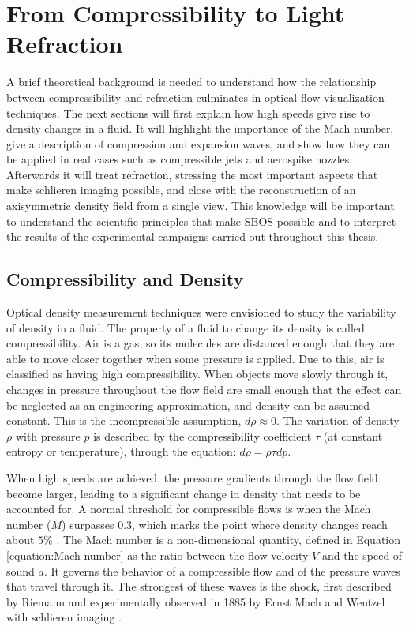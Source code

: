 \chapter{From Compressibility to Light Refraction}
\label{chapter: Theory}

\par A brief theoretical background is needed to understand how the relationship between compressibility and refraction culminates in optical flow visualization techniques. The next sections will first explain how high speeds give rise to density changes in a fluid. It will highlight the importance of the Mach number, give a description of compression and expansion waves, and show how they can be applied in real cases such as compressible jets and aerospike nozzles. Afterwards it will treat refraction, stressing the most important aspects that make schlieren imaging possible, and close with the reconstruction of an axisymmetric density field from a single view. This knowledge will be important to understand the scientific principles that make SBOS possible and to interpret the results of the experimental campaigns carried out throughout this thesis.


\section{Compressibility and Density}
\label{section: Compressibility}

\par Optical density measurement techniques were envisioned to study the variability of density in a fluid. The property of a fluid to change its density is called compressibility. Air is a gas, so its molecules are distanced enough that they are able to move closer together when some pressure is applied. Due to this, air is classified as having high compressibility. When objects move slowly through it, changes in pressure throughout the flow field are small enough that the effect can be neglected as an engineering approximation, and density can be assumed constant. This is the incompressible assumption, $d\rho \approx 0$. The variation of density $\rho$ with pressure $p$ is described by the compressibility coefficient $\tau$ (at constant entropy or temperature), through the equation: $d \rho =\rho \tau dp$.

\par When high speeds are achieved, the pressure gradients through the flow field become larger, leading to a significant change in density that needs to be accounted for. A normal threshold for compressible flows is when the Mach number ($M$) surpasses 0.3, which marks the point where density changes reach about $5\%$ \cite{TheBookOfAnderson}. The Mach number is a non-dimensional quantity, defined in Equation \ref{equation:Mach number} as the ratio between the flow velocity $V$ and the speed of sound $a$. It governs the behavior of a compressible flow and of the pressure waves that travel through it. The strongest of these waves is the shock, first described by Riemann and experimentally observed in 1885 by Ernst Mach and Wentzel with schlieren imaging \cite{Settles2001}.

